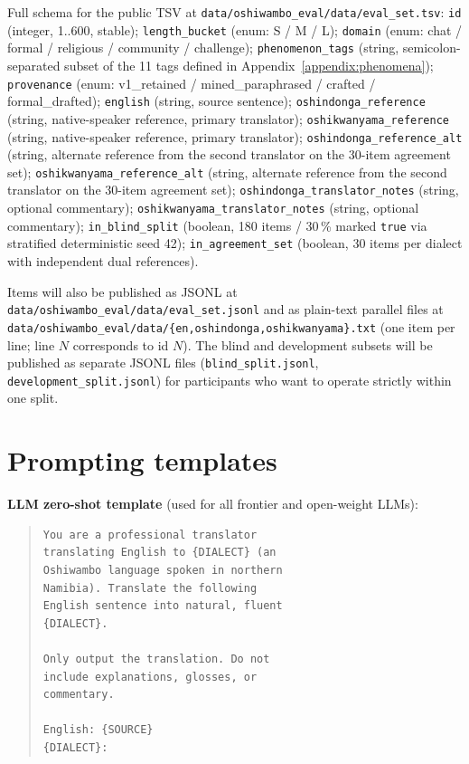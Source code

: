 \documentclass[11pt]{article}
\begin{document}
Full schema for the public TSV at \texttt{data/oshiwambo\_eval/data/eval\_set.tsv}:
\texttt{id} (integer, 1..600, stable);
\texttt{length\_bucket} (enum: S / M / L);
\texttt{domain} (enum: chat / formal / religious / community /
challenge);
\texttt{phenomenon\_tags} (string, semicolon-separated subset of
the 11 tags defined in Appendix~\ref{appendix:phenomena});
\texttt{provenance} (enum: v1\_retained / mined\_paraphrased /
crafted / formal\_drafted);
\texttt{english} (string, source sentence);
\texttt{oshindonga\_reference} (string, native-speaker reference,
primary translator);
\texttt{oshikwanyama\_reference} (string, native-speaker reference,
primary translator);
\texttt{oshindonga\_reference\_alt} (string, alternate reference
from the second translator on the 30-item agreement set);
\texttt{oshikwanyama\_reference\_alt} (string, alternate reference
from the second translator on the 30-item agreement set);
\texttt{oshindonga\_translator\_notes} (string, optional
commentary);
\texttt{oshikwanyama\_translator\_notes} (string, optional
commentary);
\texttt{in\_blind\_split} (boolean, 180 items / 30\,\% marked
\texttt{true} via stratified deterministic seed 42);
\texttt{in\_agreement\_set} (boolean, 30 items per dialect with
independent dual references).

Items will also be published as JSONL at
\texttt{data/oshiwambo\_eval/data/eval\_set.jsonl} and as
plain-text parallel files at
\texttt{data/oshiwambo\_eval/data/\{en,oshindonga,oshikwanyama\}.txt}
(one item per line; line $N$ corresponds to id $N$). The blind and
development subsets will be published as separate JSONL files
(\texttt{blind\_split.jsonl}, \texttt{development\_split.jsonl}) for
participants who want to operate strictly within one split.

\section{Prompting templates}
\label{appendix:prompt}

\textbf{LLM zero-shot template} (used for all frontier and
open-weight LLMs):

\begin{quote}
\small
\begin{verbatim}
You are a professional translator
translating English to {DIALECT} (an
Oshiwambo language spoken in northern
Namibia). Translate the following
English sentence into natural, fluent
{DIALECT}.

Only output the translation. Do not
include explanations, glosses, or
commentary.

English: {SOURCE}
{DIALECT}:
\end{verbatim}
\end{quote}
\end{document}
